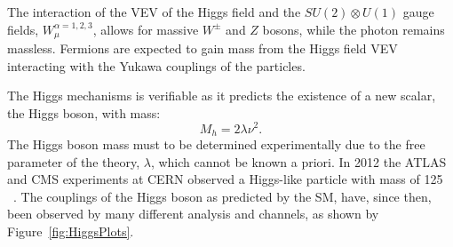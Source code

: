 	The interaction of the \ac{VEV} of the Higgs field and the $SU(2)\otimes U(1)$ gauge fields, $W_{\mu}^{\alpha=1,2,3}$, allows for massive $W^{\pm}$ and $Z$ bosons, while the photon remains massless. 
	 Fermions are expected to gain mass from the Higgs field \ac{VEV} interacting with the Yukawa couplings of the particles.
	
	The Higgs mechanisms is verifiable as it predicts the existence of a new scalar, the Higgs boson, with mass:
	\begin{equation}
	M_h = 2\lambda\nu^2.
	\end{equation} 
	The Higgs boson mass must to be determined experimentally due to the free parameter of the theory, $\lambda$, which cannot be known a priori.
	In 2012 the \ac{ATLAS} and \ac{CMS} experiments at \ac{CERN} observed a Higgs-like particle with mass of 125 \gev~\cite{ATLASHiggs2012,CMSHiggs2012}. The couplings of the Higgs boson as predicted by the \ac{SM}, have, since then, been observed by many different analysis and channels, as shown by Figure~\ref{fig:HiggsPlots}.
	\HiggsPlots
